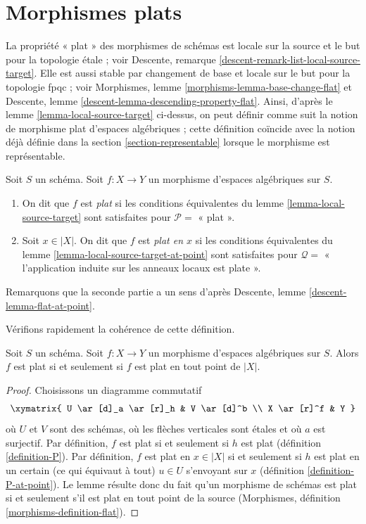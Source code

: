 \section{Morphismes plats}
\label{section-flat}

\noindent
La propriété « plat » des morphismes de schémas est
locale sur la source et le but pour la topologie étale ; voir
Descente, remarque \ref{descent-remark-list-local-source-target}.
Elle est aussi stable par changement de base et locale sur le but pour la topologie fpqc ; voir
Morphismes, lemme \ref{morphisms-lemma-base-change-flat} et
Descente, lemme \ref{descent-lemma-descending-property-flat}.
Ainsi, d'après le
lemme \ref{lemma-local-source-target}
ci-dessus, on peut définir comme suit la notion de morphisme plat d'espaces
algébriques ; cette définition coïncide avec la notion déjà définie dans la
section \ref{section-representable}
lorsque le morphisme est représentable.

\begin{definition}
\label{definition-flat}
Soit $S$ un schéma.
Soit $f : X \to Y$ un morphisme d'espaces algébriques sur $S$.
\begin{enumerate}
\item On dit que $f$ est {\it plat} si les conditions équivalentes du
lemme \ref{lemma-local-source-target} sont satisfaites pour
$\mathcal{P} =$ « plat ».
\item Soit $x \in |X|$. On dit que $f$ est {\it plat en $x$} si les
conditions équivalentes du
lemme \ref{lemma-local-source-target-at-point}
sont satisfaites pour $\mathcal{Q} =$ « l'application induite sur les anneaux locaux est plate ».
\end{enumerate}
Remarquons que la seconde partie a un sens d'après
Descente, lemme \ref{descent-lemma-flat-at-point}.
\end{definition}

\noindent
Vérifions rapidement la cohérence de cette définition.

\begin{lemma}
\label{lemma-flat-is-flat-at-all-points}
Soit $S$ un schéma. Soit $f : X \to Y$ un morphisme d'espaces algébriques
sur $S$. Alors $f$ est plat si et seulement si $f$ est plat en tout point de $|X|$.
\end{lemma}

\begin{proof}
Choisissons un diagramme commutatif
$$
\xymatrix{
U \ar[d]_a \ar[r]_h & V \ar[d]^b \\
X \ar[r]^f & Y
}
$$
où $U$ et $V$ sont des schémas, où les flèches verticales sont étales et où
$a$ est surjectif. Par définition, $f$ est plat si et seulement si $h$ est plat
(définition \ref{definition-P}).
Par définition, $f$ est plat en $x \in |X|$ si et seulement si $h$ est plat
en un certain (ce qui équivaut à tout) $u \in U$ s'envoyant sur $x$
(définition \ref{definition-P-at-point}).
Le lemme résulte donc du fait qu'un morphisme de schémas
est plat si et seulement s'il est plat en tout point de la source
(Morphismes, définition \ref{morphisms-definition-flat}).
\end{proof}

